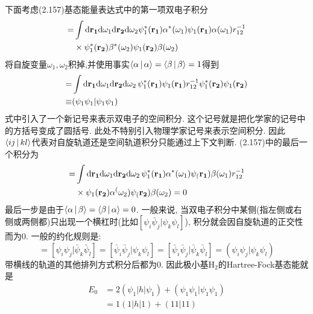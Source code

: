 下面考虑(2.157)基态能量表达式中的第一项双电子积分
\begin{align}
[{\psi_1\psi_1|\bar{\psi}_1\bar{\psi}_1}] = & \int\dd{r_1}\dd\omega_1\dd{r_2}\dd\omega_2\psi_1^*(\mathbf{r_1})\alpha^*(\omega_1)\psi_1(\mathbf{r_1})\alpha(\omega_1) r_{12}^{-1}\notag\\
&\times \psi_1^*(\mathbf{r_2})\beta^*(\omega_2)\psi_1(\mathbf{r_2})\beta(\omega_2)
\end{align}
将自旋变量$\omega_1,\omega_2$积掉,并使用事实$\Braket{\alpha|\alpha}=\Braket{\beta|\beta}=1$得到
\begin{align}
[{\psi_1\psi_1|\bar{\psi}_1\bar{\psi}_1}] = & \int\dd{r_1}\dd\omega_1\dd{r_2}\dd\omega_2\,\psi_1^*(\mathbf{r_1})\psi_1(\mathbf{r_1}) r_{12}^{-1}\psi_1^*(\mathbf{r_2})\psi_1(\mathbf{r_2})\notag\\
\equiv  &  (\psi_1\psi_1|\psi_1\psi_1) 
\end{align}
式中引入了一个新记号来表示双电子的空间积分. 这个记号就是把化学家的记号中的方括号变成了圆括号. 此处不特别引入物理学家记号来表示空间积分. 因此$\Braket{ij|kl}$代表对自旋轨道还是空间轨道积分只能通过上下文判断. (2.157)中的最后一个积分为
\begin{align}
[{\psi_1\bar{\psi}_1|\bar{\psi}_1\psi_1}] = & \int\dd{r_1}\dd\omega_1\dd{r_2}\dd\omega_2\, \psi_1^*(\mathbf{r_1})\alpha^*(\omega_1)\psi_(\mathbf{r_1})\beta(\omega_1)r_{12}^{-1}\notag\\
& \times \psi_1(\mathbf{r_2})\alpha^(\omega_2)\psi_(\mathbf{r_2})\beta(\omega_2) = 0
\end{align} 
最后一步是由于$\Braket{\alpha|\beta}=\Braket{\beta|\alpha} = 0$. 一般来说, 当双电子积分中某侧(指左侧或右侧或两侧都)只出现一个横杠时(比如$[\psi_i\bar{\psi}_j|\psi_k\psi_l]$), 积分就会因自旋轨道的正交性而为0. 一般的约化规则是:
\begin{equation}
[\psi_i\psi_j|\psi_k\psi_l] = 
[\psi_i\psi_j|\bar{\psi}_k\bar{\psi}_l] = [\bar{\psi}_i\bar{\psi}_j|\psi_k\psi_l] = [\bar{\psi}_i\bar{\psi}_j|\bar{\psi}_k\bar{\psi}_l] = (\psi_i\psi_j|\psi_k\psi_l)
\end{equation}
带横线的轨道的其他排列方式积分后都为0. 因此极小基$\mathrm{H}_2$的Hartree-Fock基态能就是
\begin{align}
E_0 & = 2(\psi_1|h|\psi_1) + (\psi_1\psi_1|\psi_1\psi_1)\\
    & = 1(1|h|1) + (11|11)
\end{align} 
